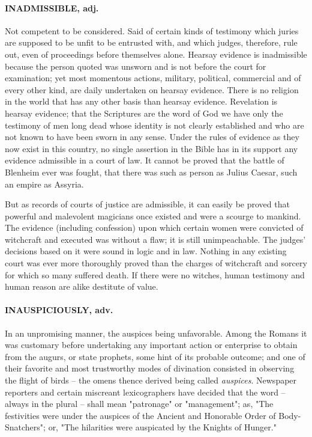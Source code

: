 \documentclass[11pt]{article}
\begin{document}
\paragraph{INADMISSIBLE, adj.}  Not competent to be considered.  Said of certain
kinds of testimony which juries are supposed to be unfit to be
entrusted with, and which judges, therefore, rule out, even of
proceedings before themselves alone.  Hearsay evidence is inadmissible
because the person quoted was unsworn and is not before the court for
examination; yet most momentous actions, military, political,
commercial and of every other kind, are daily undertaken on hearsay
evidence.  There is no religion in the world that has any other basis
than hearsay evidence.  Revelation is hearsay evidence; that the
Scriptures are the word of God we have only the testimony of men long
dead whose identity is not clearly established and who are not known
to have been sworn in any sense.  Under the rules of evidence as they
now exist in this country, no single assertion in the Bible has in its
support any evidence admissible in a court of law.  It cannot be
proved that the battle of Blenheim ever was fought, that there was
such as person as Julius Caesar, such an empire as Assyria.

But as records of courts of justice are admissible, it can easily
be proved that powerful and malevolent magicians once existed and were
a scourge to mankind.  The evidence (including confession) upon which
certain women were convicted of witchcraft and executed was without a
flaw; it is still unimpeachable.  The judges' decisions based on it
were sound in logic and in law.  Nothing in any existing court was
ever more thoroughly proved than the charges of witchcraft and sorcery
for which so many suffered death.  If there were no witches, human
testimony and human reason are alike destitute of value.

\paragraph{INAUSPICIOUSLY, adv.}  In an unpromising manner, the auspices being
unfavorable.  Among the Romans it was customary before undertaking any
important action or enterprise to obtain from the augurs, or state
prophets, some hint of its probable outcome; and one of their favorite
and most trustworthy modes of divination consisted in observing the
flight of birds -- the omens thence derived being called {\em auspices}.
Newspaper reporters and certain miscreant lexicographers have decided
that the word -- always in the plural -- shall mean "patronage" or
"management"; as, "The festivities were under the auspices of the
Ancient and Honorable Order of Body-Snatchers"; or, "The hilarities
were auspicated by the Knights of Hunger."
\end{document}
